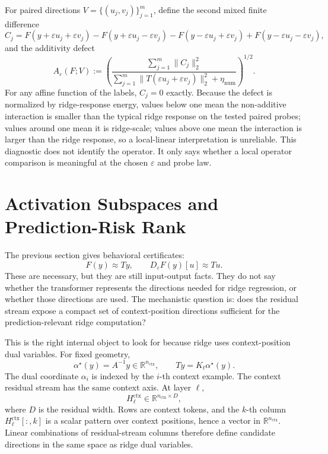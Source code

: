 \documentclass[11pt]{article}
\newcommand{\R}{\mathbb{R}}
\begin{document}
For paired directions \(V=\{(u_j,v_j)\}_{j=1}^m\), define the second mixed finite difference
\[
C_j =
F(y+\varepsilon u_j+\varepsilon v_j)
-F(y+\varepsilon u_j-\varepsilon v_j)
-F(y-\varepsilon u_j+\varepsilon v_j)
+F(y-\varepsilon u_j-\varepsilon v_j),
\]
and the additivity defect
\[
A_\varepsilon(F;V)
:=
\left(
\frac{
\sum_{j=1}^m\|C_j\|_2^2
}{
\sum_{j=1}^m\|T(\varepsilon u_j+\varepsilon v_j)\|_2^2+\eta_{\mathrm{num}}
}
\right)^{1/2}.
\]
For any affine function of the labels, \(C_j=0\) exactly. Because the defect is normalized by
ridge-response energy, values below one mean the non-additive interaction is smaller than the
typical ridge response on the tested paired probes; values around one mean it is ridge-scale; values
above one mean the interaction is larger than the ridge response, so a local-linear interpretation is
unreliable. This diagnostic does not identify the operator. It only says whether a local operator
comparison is meaningful at the chosen \(\varepsilon\) and probe law.

\section{Activation Subspaces and Prediction-Risk Rank}

The previous section gives behavioral certificates:
\[
F(y)\approx Ty,\qquad D_\varepsilon F(y)[u]\approx Tu.
\]
These are necessary, but they are still input-output facts. They do not say whether the transformer
represents the directions needed for ridge regression, or whether those directions are used. The
mechanistic question is: does the residual stream expose a compact set of context-position
directions sufficient for the prediction-relevant ridge computation?

This is the right internal object to look for because ridge uses context-position dual variables.
For fixed geometry,
\[
\alpha^\star(y)=A^{-1}y\in\R^{n_{\mathrm{ctx}}},
\qquad
Ty=K_t\alpha^\star(y).
\]
The dual coordinate \(\alpha_i\) is indexed by the \(i\)-th context example. The context residual
stream has the same context axis. At layer \(\ell\),
\[
H_\ell^{\mathrm{ctx}}\in\R^{n_{\mathrm{ctx}}\times D},
\]
where \(D\) is the residual width. Rows are context tokens, and the \(k\)-th column
\(H_\ell^{\mathrm{ctx}}[:,k]\) is a scalar pattern over context positions, hence a vector in
\(\R^{n_{\mathrm{ctx}}}\). Linear combinations of residual-stream columns therefore define
candidate directions in the same space as ridge dual variables.
\end{document}
